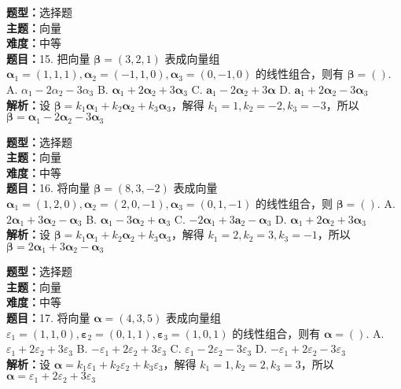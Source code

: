 \documentclass{ctexart}
\newenvironment{question}[5]{%
	\noindent\textbf{题型：}#1\\
	\textbf{主题：}#2\\
	\textbf{难度：}#3\\
	\textbf{题目：}#4\\
	\textbf{解析：}#5\\
	\vspace{1em}
}{}
\begin{document}
	\begin{question}
		{选择题}
		{向量}
		{中等}
		{15. 把向量 \(\boldsymbol{\beta}=(3,2,1)\) 表成向量组 \(\boldsymbol{\alpha}_1=(1,1,1), \boldsymbol{\alpha}_2=(-1,1,0), \boldsymbol{\alpha}_3=(0,-1,0)\) 的线性组合，则有 \(\boldsymbol{\beta}=()\). 
			A. \(\alpha_1-2\alpha_2-3\alpha_3\)
			B. \(\boldsymbol{\alpha}_1+2\boldsymbol{\alpha}_2+3\boldsymbol{\alpha}_3\)
			C. \(\mathbf{a}_1-2\boldsymbol{\alpha}_2+3\boldsymbol{\alpha}\)
			D. \(\mathbf{a}_1+2\boldsymbol{\alpha}_2-3\boldsymbol{\alpha}_3\)}
		{设 \(\boldsymbol{\beta}=k_1\boldsymbol{\alpha}_1+k_2\boldsymbol{\alpha}_2+k_3\boldsymbol{\alpha}_3\)，解得 \(k_1=1,k_2=-2,k_3=-3\)，所以 \(\boldsymbol{\beta}=\boldsymbol{\alpha}_1-2\boldsymbol{\alpha}_2-3\boldsymbol{\alpha}_3\)}
	\end{question}
	
	\begin{question}
		{选择题}
		{向量}
		{中等}
		{16. 将向量 \(\boldsymbol{\beta}=(8,3,-2)\) 表成向量 \(\boldsymbol{\alpha}_1=(1,2,0), \boldsymbol{\alpha}_2=(2,0,-1), \boldsymbol{\alpha}_3=(0,1,-1)\) 的线性组合，则 \(\boldsymbol{\beta}=()\). 
			A. \(2\boldsymbol{\alpha}_1+3\boldsymbol{\alpha}_2-\boldsymbol{\alpha}_3\)
			B. \(\boldsymbol{\alpha}_1-3\boldsymbol{\alpha}_2+\boldsymbol{\alpha}_3\)
			C. \(-2\boldsymbol{\alpha}_1+3\boldsymbol{a}_2-\boldsymbol{\alpha}_3\)
			D. \(\boldsymbol{\alpha}_1+2\boldsymbol{\alpha}_2+3\boldsymbol{\alpha}_3\)}
		{设 \(\boldsymbol{\beta}=k_1\boldsymbol{\alpha}_1+k_2\boldsymbol{\alpha}_2+k_3\boldsymbol{\alpha}_3\)，解得 \(k_1=2,k_2=3,k_3=-1\)，所以 \(\boldsymbol{\beta}=2\boldsymbol{\alpha}_1+3\boldsymbol{\alpha}_2-\boldsymbol{\alpha}_3\)}
	\end{question}
	
	\begin{question}
		{选择题}
		{向量}
		{中等}
		{17. 将向量 \(\boldsymbol{\alpha}=(4,3,5)\) 表成向量组 \(\varepsilon_1=(1,1,0), \boldsymbol{\varepsilon}_2=(0,1,1), \boldsymbol{\varepsilon}_3=(1,0,1)\) 的线性组合，则有 \(\boldsymbol{\alpha}=()\). 
			A. \(\varepsilon_1+2\varepsilon_2+3\varepsilon_3\)
			B. \(-\varepsilon_1+2\varepsilon_2+3\varepsilon_3\)
			C. \(\varepsilon_1-2\varepsilon_2-3\varepsilon_3\)
			D. \(-\varepsilon_1+2\varepsilon_2-3\varepsilon_3\)}
		{设 \(\boldsymbol{\alpha}=k_1\varepsilon_1+k_2\varepsilon_2+k_3\varepsilon_3\)，解得 \(k_1=1,k_2=2,k_3=3\)，所以 \(\boldsymbol{\alpha}=\varepsilon_1+2\varepsilon_2+3\varepsilon_3\)}
	\end{question}
	
\end{document}
